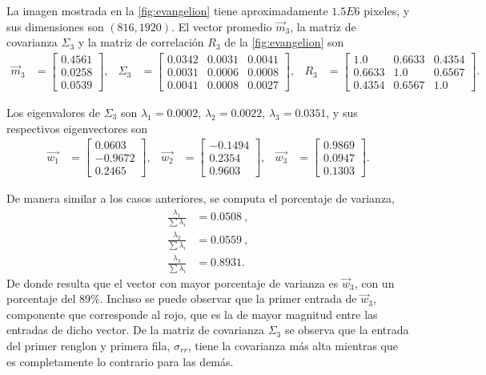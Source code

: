 La imagen mostrada en la \cref{fig:evangelion} tiene aproximadamente $1.5E6$ pixeles, y sus dimensiones son $(816, 1920)$. El vector promedio $\vec{m}_3$, la matriz de covarianza $\Sigma_3$ y la matriz de correlación $R_3$ de la \cref{fig:evangelion} son
\begin{align*}
    \vec{m}_3 & =
    \begin{bmatrix}
        0.4561 \\
        0.0258 \\
        0.0539
    \end{bmatrix}, &
    \Sigma_3 & =
    \begin{bmatrix}
        0.0342 & 0.0031 & 0.0041 \\
        0.0031 & 0.0006 & 0.0008 \\
        0.0041 & 0.0008 & 0.0027
    \end{bmatrix}, &
    R_3 & = 
    \begin{bmatrix}
        1.0    & 0.6633 & 0.4354 \\
        0.6633 & 1.0    & 0.6567 \\
        0.4354 & 0.6567 & 1.0
    \end{bmatrix}.
\end{align*}

Los eigenvalores de $\Sigma_3$ son $\lambda_1 = 0.0002$, $\lambda_2 = 0.0022$, $\lambda_3 = 0.0351$, y sus respectivos eigenvectores son
\begin{align*}
    \vec{w_1} & =
    \begin{bmatrix}
        0.0603 \\
        -0.9672 \\
        0.2465
    \end{bmatrix}, &
    \vec{w_2} & = 
    \begin{bmatrix}
        -0.1494 \\
        0.2354 \\
        0.9603
    \end{bmatrix}, &
    \vec{w_3} & =
    \begin{bmatrix}
        0.9869 \\
        0.0947 \\
        0.1303
    \end{bmatrix}.
\end{align*}

De manera similar a los casos anteriores, se computa el porcentaje de varianza,
\begin{align*}
    \frac{\lambda_1}{\sum \lambda_i} & = 0.0508\ , \\
    \frac{\lambda_2}{\sum \lambda_i} & = 0.0559\ , \\
    \frac{\lambda_3}{\sum \lambda_i} & = 0.8931 .
\end{align*}
De donde resulta que el vector con mayor porcentaje de varianza es $\vec{w}_3$, con un porcentaje del $89\%$. Incluso se puede observar que la primer entrada de $\vec{w}_3$, componente que corresponde al rojo, que es la de mayor magnitud entre las entradas de dicho vector. De la matriz de covarianza $\Sigma_3$ se observa que la entrada del primer renglon y primera fila, $\sigma_{rr}$, tiene la covarianza más alta mientras que es completamente lo contrario para las demás.

